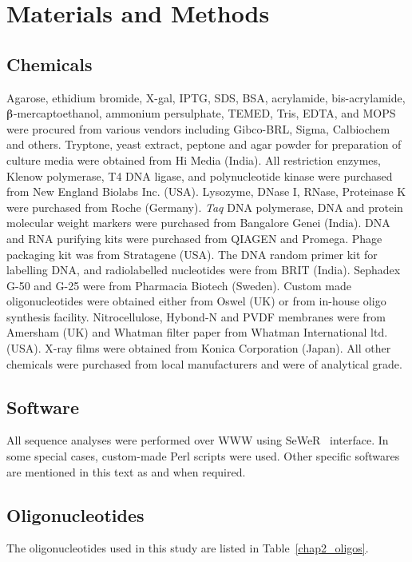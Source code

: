 \chapter{Materials and Methods}

\section{Chemicals}

Agarose, ethidium bromide, X-gal, IPTG, SDS, BSA, acrylamide,
bis-acry\-la\-mide, $\betaup$-mercapto\-ethanol, ammonium
persulphate, TEMED, Tris, EDTA, and MOPS were procured from
various vendors including Gibco-BRL, Sigma, Calbiochem and others.
Tryptone, yeast extract, peptone and agar powder for preparation
of culture media were obtained from Hi Media (India). All
restriction enzymes, Klenow polymerase, T4 DNA ligase, and
polynucleotide kinase were purchased from New England Biolabs Inc.
(USA). Lysozyme, DNase I, RNase, Proteinase K were purchased from
Roche (Germany). \textit{Taq} DNA polymerase, DNA and protein
molecular weight markers were purchased from Bangalore Genei
(India). DNA and RNA purifying kits were purchased from QIAGEN and
Promega. Phage packaging kit was from Stratagene (USA). The DNA
random primer kit for labelling DNA, and radiolabelled nucleotides
were from BRIT (India). Sephadex G-50 and G-25 were from Pharmacia
Bio\-tech (Sweden). Custom made oligonucleotides were obtained
either from Oswel (UK) or from in-house oligo synthesis facility.
Nitrocellulose, Hybond{\scriptsize\texttrademark}-N\su{+} and
PVDF{\scriptsize\texttrademark} membranes were from Amersham (UK)
and Whatman filter paper from Whatman International ltd. (USA).
X-ray films were obtained from Konica Corporation (Japan). All
other chemicals were purchased from local manufacturers and were
of analytical grade.

\section{Software} All sequence analyses were performed over WWW
using SeWeR~\citep{Basu2001} interface. In some special cases,
custom-made Perl scripts were used. Other specific softwares are
mentioned in this text as and when required.

\section{Oligonucleotides}

The oligonucleotides used in this study are listed in
Table~\ref{chap2_oligos}.


